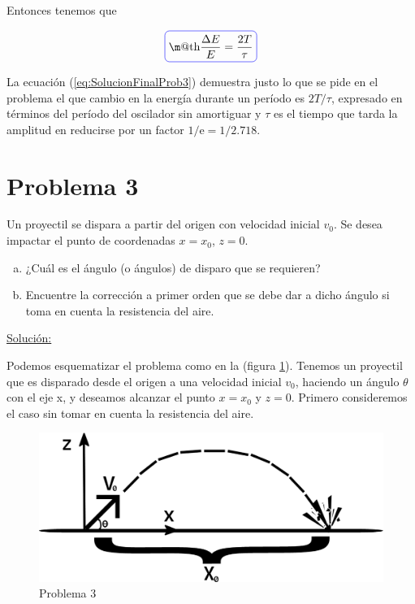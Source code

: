 \documentclass[a4paper,10pt]{article}
\makeatletter
\numberwithin{equation}{section}
\newcommand*{\boxcolor}{blue}
\renewcommand{\boxed}[1]{\textcolor{\boxcolor}{%
\tikz[baseline={([yshift=-1ex]current bounding box.center)}] \node [rectangle, minimum width=1ex,rounded corners,draw] {\normalcolor\m@th$\displaystyle#1$};}}
\newcommand{\euler}{\mathrm{e}}
\makeatother
\begin{document}
Entonces tenemos que 

\begin{equation}
 \boxed{\frac{\Delta E}{E} = \frac{2T}{\tau}}
 \label{eq:SolucionFinalProb3}
\end{equation}

La ecuación (\ref{eq:SolucionFinalProb3}) demuestra justo lo que se pide en el problema
el que cambio en la energía durante un período es $2T/\tau$, expresado en términos del
período del oscilador sin amortiguar y $\tau$ es el tiempo que tarda la amplitud en reducirse
por un factor $1/\euler = 1 / 2.718$.











\vspace{.3cm}

\section{Problema 3}
Un proyectil se dispara a partir del origen con velocidad inicial $v_{0}$.
Se desea impactar el punto de coordenadas $x=x_{0}$, $z=0$.

\begin{enumerate}[a)]
 \item ¿Cuál es el ángulo (o ángulos) de disparo que se requieren?
 \item Encuentre la corrección a primer orden que se debe dar a dicho ángulo si toma 
 en cuenta la resistencia del aire.
\end{enumerate}
\vspace{.3cm}

\underline{Solución:}

\vspace{.3cm}

Podemos esquematizar el problema como en la (figura \ref{fig:problema3}). 
Tenemos un proyectil que es disparado desde el origen a una velocidad 
inicial $v_0$, haciendo un ángulo $\theta$ con el eje x, y deseamos
alcanzar el punto $x=x_0$ y $z=0$. Primero consideremos el caso sin
tomar en cuenta la resistencia del aire.

\begin{figure}[ht]
 \centering
\includegraphics[scale=0.3]{problema3fig1}
\caption{Problema 3}
\label{fig:problema3}
\end{figure}
\end{document}
